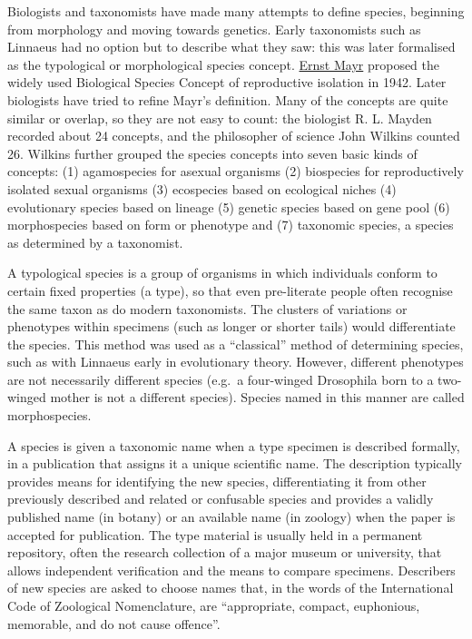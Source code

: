 Biologists and taxonomists have made many attempts to define species, beginning from morphology and moving towards genetics. Early taxonomists such as Linnaeus had no option but to describe what they saw: this was later formalised as the typological or morphological species concept. \href{https://en.wikipedia.org/wiki/Ernst_Mayr}{Ernst Mayr} proposed the widely used Biological Species Concept of reproductive isolation in 1942. Later biologists have tried to refine Mayr's definition. Many of the concepts are quite similar or overlap, so they are not easy to count: the biologist R. L. Mayden recorded about 24 concepts, and the philosopher of science John Wilkins counted 26. Wilkins further grouped the species concepts into seven basic kinds of concepts: (1) agamospecies for asexual organisms (2) biospecies for reproductively isolated sexual organisms (3) ecospecies based on ecological niches (4) evolutionary species based on lineage (5) genetic species based on gene pool (6) morphospecies based on form or phenotype and (7) taxonomic species, a species as determined by a taxonomist.

A typological species is a group of organisms in which individuals conform to certain fixed properties (a type), so that even pre-literate people often recognise the same taxon as do modern taxonomists. The clusters of variations or phenotypes within specimens (such as longer or shorter tails) would differentiate the species. This method was used as a ``classical'' method of determining species, such as with Linnaeus early in evolutionary theory. However, different phenotypes are not necessarily different species (e.g.~a four-winged Drosophila born to a two-winged mother is not a different species). Species named in this manner are called morphospecies.

A species is given a taxonomic name when a type specimen is described formally, in a publication that assigns it a unique scientific name. The description typically provides means for identifying the new species, differentiating it from other previously described and related or confusable species and provides a validly published name (in botany) or an available name (in zoology) when the paper is accepted for publication. The type material is usually held in a permanent repository, often the research collection of a major museum or university, that allows independent verification and the means to compare specimens. Describers of new species are asked to choose names that, in the words of the International Code of Zoological Nomenclature, are ``appropriate, compact, euphonious, memorable, and do not cause offence''.

